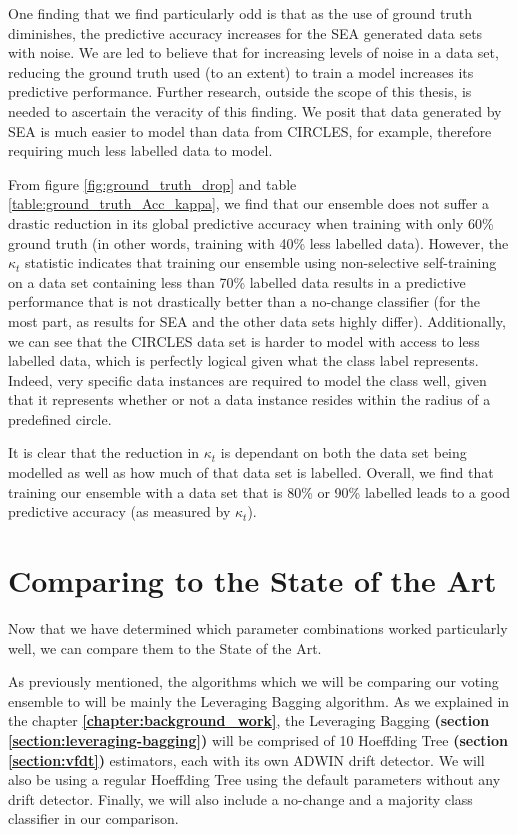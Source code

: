 One finding that we find particularly odd is that as the use of ground truth diminishes, the predictive accuracy increases for the SEA generated data sets with noise. We are led to believe that for increasing levels of noise in a data set, reducing the ground truth used (to an extent) to train a model increases its predictive performance. Further research, outside the scope of this thesis, is needed to ascertain the veracity of this finding. We posit that data generated by SEA is much easier to model than data from CIRCLES, for example, therefore requiring much less labelled data to model.

From figure \ref{fig:ground_truth_drop} and table \ref{table:ground_truth_Acc_kappa}, we find that our ensemble does not suffer a drastic reduction in its global predictive accuracy when training with only 60\% ground truth (in other words, training with 40\% less labelled data). However, the $\kappa_t$ statistic indicates that training our ensemble using non-selective self-training on a data set containing less than 70\% labelled data results in a predictive performance that is not drastically better than a no-change classifier (for the most part, as results for SEA and the other data sets highly differ). Additionally, we can see that the CIRCLES data set is harder to model with access to less labelled data, which is perfectly logical given what the class label represents. Indeed, very specific data instances are required to model the class well, given that it represents whether or not a data instance resides within the radius of a predefined circle.

It is clear that the reduction in $\kappa_t$ is dependant on both the data set being modelled as well as how much of that data set is labelled. Overall, we find that training our ensemble with a data set that is 80\% or 90\% labelled leads to a good predictive accuracy (as measured by $\kappa_t$).

\section{Comparing to the State of the Art}

Now that we have determined which parameter combinations worked particularly well, we can compare them to the State of the Art.

As previously mentioned, the algorithms which we will be comparing our voting ensemble to will be mainly the Leveraging Bagging algorithm. As we explained in the chapter \textbf{\ref{chapter:background_work}}, the Leveraging Bagging \textbf{(section \ref{section:leveraging-bagging})} will be comprised of 10 Hoeffding Tree \textbf{(section \ref{section:vfdt})} estimators, each with its own ADWIN drift detector. We will also be using a regular Hoeffding Tree using the default parameters without any drift detector. Finally, we will also include a no-change and a majority class classifier in our comparison.

